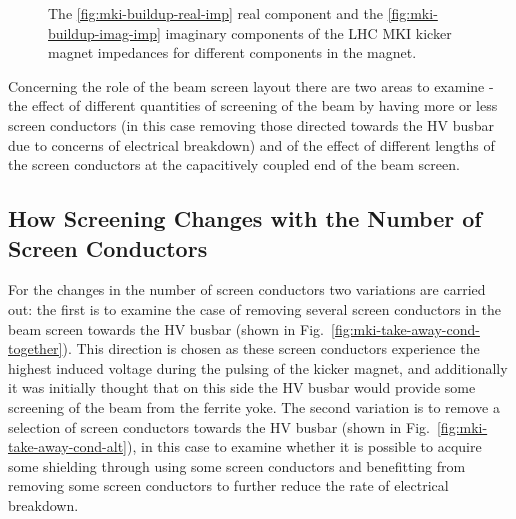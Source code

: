 \begin{figure}
\caption{The \ref{fig:mki-buildup-real-imp} real component and the \ref{fig:mki-buildup-imag-imp} imaginary components of the LHC MKI kicker magnet impedances for different components in the magnet.}
\label{fig:mki-buildup-impedance}
\end{figure}


Concerning the role of the beam screen layout there are two areas to examine - the effect of different quantities of screening of the beam by having more or less screen conductors (in this case removing those directed towards the HV busbar due to concerns of electrical breakdown) and of the effect of different lengths of the screen conductors at the capacitively coupled end of the beam screen.

\subsection{How Screening Changes with the Number of Screen Conductors}

For the changes in the number of screen conductors two variations are carried out: the first is to examine the case of removing several screen conductors in the beam screen towards the HV busbar (shown in Fig.~\ref{fig:mki-take-away-cond-together}). This direction is chosen as these screen conductors experience the highest induced voltage during the pulsing of the kicker magnet, and additionally it was initially thought that on this side the HV busbar would provide some screening of the beam from the ferrite yoke. The second variation is to remove a selection of screen conductors towards the HV busbar (shown in Fig.~\ref{fig:mki-take-away-cond-alt}), in this case to examine whether it is possible to acquire some shielding through using some screen conductors and benefitting from removing some screen conductors to further reduce the rate of electrical breakdown.

